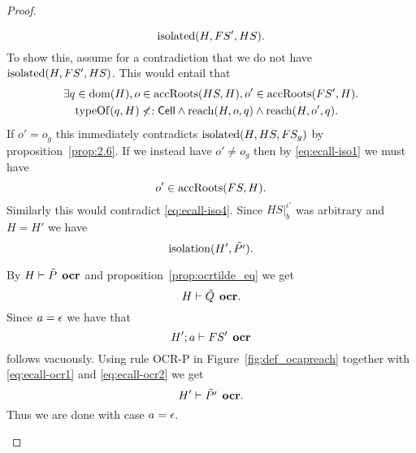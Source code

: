 \begin{proof}
\begin{description}
\begin{description}
          \begin{equation}
            \mbox{$\mathrm{isolated}$}(H, FS', HS).
          \end{equation}
          To show this, assume for a contradiction that we do not have
          $\mbox{$\mathrm{isolated}$}(H, FS', HS)$. This would entail that
          \begin{equation}
            \begin{aligned}
              \exists q &\in \mbox{$\mathrm{dom}$}(H), o \in \mbox{$\mathrm{accRoots}$}(HS, H), o' \in
              \mbox{$\mathrm{accRoots}$}(FS', H) . \\
              &\mbox{$\mathrm{typeOf}$}(q, H) \not<: \mbox{$\mathsf{Cell}$} \land \mbox{$\mathrm{reach}$}(H, o, q) \land
              \mbox{$\mathrm{reach}$}(H, o', q).
            \end{aligned}
          \end{equation}
          If $o' = o_g$ this immediately contradicts $\mbox{$\mathrm{isolated}$}(H, HS, FS_g)$ by
          proposition~\ref{prop:2.6}. If we instead have $o' \neq o_g$ then by
          \eqref{eq:ecall-iso1} we must have
          \begin{equation}
            o' \in \mbox{$\mathrm{accRoots}$}(FS, H).
          \end{equation}
          Similarly this would contradict \eqref{eq:ecall-iso4}.  Since
          $HS|_b^{\iota'}$ was arbitrary and $H = H'$ we have 
          \begin{equation}
            \mbox{$\mathrm{isolation}$}(H', \tilde{P'}).
          \end{equation}

          By $H \vdash \tilde{P} \:\: \mbox{\bf ocr}$ and
          proposition~\ref{prop:ocrtilde_eq} we get
          \begin{equation} \label{eq:ecall-ocr1}
            H \vdash \tilde{Q} \:\: \mbox{\bf ocr}.
          \end{equation}
          Since $a = \mbox{$\epsilon$}$ we have that 
          \begin{equation} \label{eq:ecall-ocr2}
            H'; a \vdash FS' \:\: \mbox{\bf ocr} 
          \end{equation} 
          follows vacuously. Using rule {\sc OCR-P} in
          Figure~\ref{fig:def_ocapreach} together with \eqref{eq:ecall-ocr1} and
          \eqref{eq:ecall-ocr2} we get
          \begin{equation}
            H' \vdash \tilde{P'} \:\: \mbox{\bf ocr}.
          \end{equation}  
          Thus we are done with case $a = \mbox{$\epsilon$}$.
          

\end{description}
\end{description}
\end{proof}
